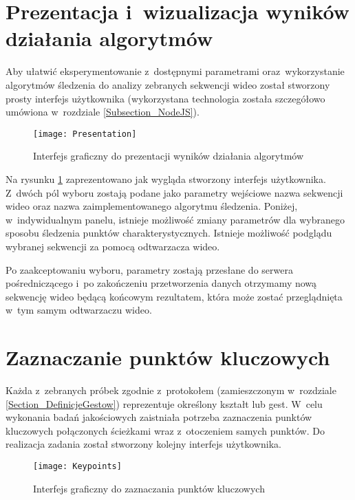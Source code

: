   \section{Prezentacja i~wizualizacja wyników działania algorytmów}\label{Section_Front}
    Aby ułatwić eksperymentowanie z~dostępnymi parametrami oraz~wykorzystanie algorytmów śledzenia do analizy zebranych sekwencji wideo został stworzony prosty interfejs użytkownika (wykorzystana technologia została szczegółowo umówiona w~rozdziale \ref{Subsection_NodeJS}).

    \begin{figure}[!ht]
      \centering
      \texttt{[image: Presentation]}
      \caption[Interfejs graficzny do prezentacji wyników działania algorytmów]{Interfejs graficzny do prezentacji wyników działania algorytmów}
      \label{fig:AlgorithmsPresentation}
    \end{figure}

    Na rysunku \ref{fig:AlgorithmsPresentation} zaprezentowano jak wygląda stworzony interfejs użytkownika. Z~dwóch pól wyboru zostają podane jako parametry wejściowe nazwa sekwencji wideo oraz nazwa zaimplementowanego algorytmu śledzenia. Poniżej, w~indywidualnym panelu, istnieje możliwość zmiany parametrów dla wybranego sposobu śledzenia punktów charakterystycznych. Istnieje możliwość podglądu wybranej sekwencji za pomocą odtwarzacza wideo.

    Po zaakceptowaniu wyboru, parametry zostają przesłane do serwera pośredniczącego i~po zakończeniu przetworzenia danych otrzymamy nową sekwencję wideo będącą końcowym rezultatem, która może zostać przeglądnięta w~tym samym odtwarzaczu wideo.

  \section{Zaznaczanie punktów kluczowych}\label{Section_Keypoints}
    Każda z~zebranych próbek zgodnie z~protokołem (zamieszczonym w~rozdziale \ref{Section_DefinicjeGestow}) reprezentuje określony kształt lub gest. W~celu wykonania badań jakościowych zaistniała potrzeba zaznaczenia punktów kluczowych połączonych ścieżkami wraz z~otoczeniem samych punktów. Do realizacja zadania został stworzony kolejny interfejs użytkownika.

    \begin{figure}[!ht]
      \centering
      \texttt{[image: Keypoints]}
      \caption[Interfejs graficzny do zaznaczania punktów kluczowych]{Interfejs graficzny do zaznaczania punktów kluczowych}
      \label{fig:Keypoints}
    \end{figure}

